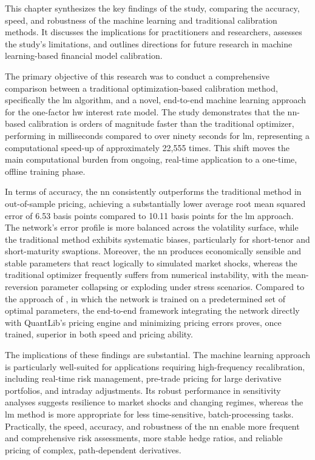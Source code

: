 This chapter synthesizes the key findings of the study, comparing the accuracy, speed, and robustness of the machine learning and traditional calibration methods. It discusses the implications for practitioners and researchers, assesses the study's limitations, and outlines directions for future research in machine learning-based financial model calibration.

The primary objective of this research was to conduct a comprehensive comparison between a traditional optimization-based calibration method, specifically the \ac{lm} algorithm, and a novel, end-to-end machine learning approach for the one-factor \ac{hw} interest rate model. The study demonstrates that the \ac{nn}-based calibration is orders of magnitude faster than the traditional optimizer, performing in milliseconds compared to over ninety seconds for \ac{lm}, representing a computational speed-up of approximately 22,555 times. This shift moves the main computational burden from ongoing, real-time application to a one-time, offline training phase.  

In terms of accuracy, the \ac{nn} consistently outperforms the traditional method in out-of-sample pricing, achieving a substantially lower average root mean squared error of 6.53 basis points compared to 10.11 basis points for the \ac{lm} approach. The network's error profile is more balanced across the volatility surface, while the traditional method exhibits systematic biases, particularly for short-tenor and short-maturity swaptions. Moreover, the \ac{nn} produces economically sensible and stable parameters that react logically to simulated market shocks, whereas the traditional optimizer frequently suffers from numerical instability, with the mean-reversion parameter collapsing or exploding under stress scenarios. Compared to the approach of \textcite{hernandez2016model}, in which the network is trained on a predetermined set of optimal parameters, the end-to-end framework integrating the network directly with QuantLib's pricing engine and minimizing pricing errors proves, once trained, superior in both speed and pricing ability.  

The implications of these findings are substantial. The machine learning approach is particularly well-suited for applications requiring high-frequency recalibration, including real-time risk management, pre-trade pricing for large derivative portfolios, and intraday adjustments. Its robust performance in sensitivity analyses suggests resilience to market shocks and changing regimes, whereas the \ac{lm} method is more appropriate for less time-sensitive, batch-processing tasks. Practically, the speed, accuracy, and robustness of the \ac{nn} enable more frequent and comprehensive risk assessments, more stable hedge ratios, and reliable pricing of complex, path-dependent derivatives.  


